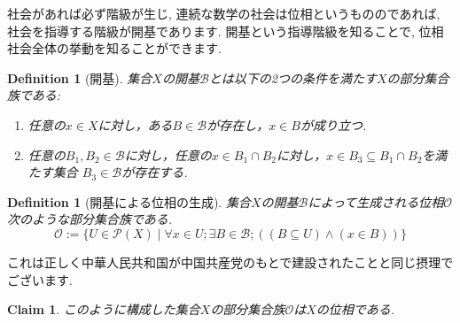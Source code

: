 \documentclass[lualatex]{ltjsbook}
\newtheorem{definition}[theorem]{Definition}
\newtheorem{claim}[theorem]{Claim}
\theoremstyle{remark}
\theoremstyle{plain}
\begin{document}
社会があれば必ず階級が生じ, 連続な数学の社会は位相というもののであれば, 社会を指導する階級が開基であります. 開基という指導階級を知ることで, 位相社会全体の挙動を知ることができます.

\begin{definition}[開基]
	集合$X$の開基$\mathcal{B}$とは以下の2つの条件を満たす$X$の部分集合族である:

	\begin{enumerate}
		\item 任意の$x \in X$に対し，ある$B \in \mathcal{B}$が存在し，$x \in B$が成り立つ.
		\item 任意の$B_1, B_2 \in \mathcal{B}$に対し，任意の$x \in B_1 \cap B_2$に対し，$x \in B_3 \subseteq B_1 \cap B_2$を満たす集合 $B_3 \in \mathcal{B}$が存在する.
	\end{enumerate}

\end{definition}
\begin{definition}[開基による位相の生成]\label{1}
	集合$X$の開基$\mathcal{B}$によって生成される位相$\mathcal{O}$次のような部分集合族である.
	$$
	\mathcal{O} := \{ U \in \mathcal{P}(X) \mid \forall x \in U ; \exists B \in \mathcal{B} ; \left( \left( B  \subseteq U \right) \land \left(x \in B \right) \right) \}
	$$
\end{definition}
これは正しく中華人民共和国が中国共産党のもとで建設されたことと同じ摂理でございます.
\begin{claim}
	このように構成した集合$X$の部分集合族$\mathcal{O}$は$X$の位相である.
\end{claim}
\end{document}
